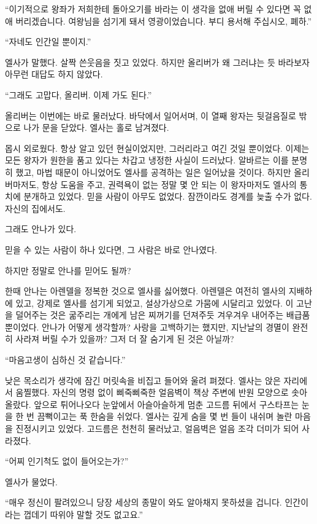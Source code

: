 ``이기적으로 왕좌가 저희한테 돌아오기를 바라는 이 생각을 없애 버릴 수 있다면 꼭 없애 버리겠습니다. 여왕님을 섬기게 돼서 영광이었습니다. 부디 용서해 주십시오, 폐하.''

``자네도 인간일 뿐이지.''

엘사가 말했다. 살짝 쓴웃음을 짓고 있었다. 하지만 올리버가 왜 그러냐는 듯 바라보자 아무런 대답도 하지 않았다.

``그래도 고맙다, 올리버. 이제 가도 된다.''

올리버는 이번에는 바로 물러났다. 바닥에서 일어서며, 이 열째 왕자는 뒷걸음질로 밖으로 나가 문을 닫았다. 엘사는 홀로 남겨졌다.

몹시 외로웠다. 항상 알고 있던 현실이었지만, 그러리라고 여긴 것일 뿐이었다. 이제는 모든 왕자가 원한을 품고 있다는 차갑고 냉정한 사실이 드러났다. 알바르는 이를 분명히 했고, 마법 때문이 아니었어도 엘사를 공격하는 일은 일어났을 것이다. 하지만 올리버마저도, 항상 도움을 주고, 권력욕이 없는 정말 몇 안 되는 이 왕자마저도 엘사의 통치에 분개하고 있었다. 믿을 사람이 아무도 없었다. 잠깐이라도 경계를 늦출 수가 없다. 자신의 집에서도.

그래도 안나가 있다.

믿을 수 있는 사람이 하나 있다면, 그 사람은 바로 안나였다.

하지만 정말로 안나를 믿어도 될까?

한때 안나는 아렌델을 정복한 것으로 엘사를 싫어했다. 아렌델은 여전히 엘사의 지배하에 있고, 강제로 엘사를 섬기게 되었고, 설상가상으로 가뭄에 시달리고 있었다. 이 고난을 덜어주는 것은 굶주리는 개에게 남은 찌꺼기를 던져주듯 겨우겨우 내어주는 배급품뿐이었다. 안나가 어떻게 생각할까? 사랑을 고백하기는 했지만, 지난날의 경멸이 완전히 사라져 버릴 수가 있을까? 그저 더 잘 숨기게 된 것은 아닐까?

``마음고생이 심하신 것 같습니다.''

낮은 목소리가 생각에 잠긴 머릿속을 비집고 들어와 울려 펴졌다. 엘사는 앉은 자리에서 움찔했다. 자신의 명령 없이 삐죽삐죽한 얼음벽이 책상 주변에 반원 모양으로 솟아올랐다. 앞으로 튀어나오다 눈앞에서 아슬아슬하게 멈춘 고드름 뒤에서 구스타프는 눈을 한 번 끔뻑이고는 푹 한숨을 쉬었다. 엘사는 깊게 숨을 몇 번 들이 내쉬며 놀란 마음을 진정시키고 있었다. 고드름은 천천히 물러났고, 얼음벽은 얼음 조각 더미가 되어 사라졌다.

``어찌 인기척도 없이 들어오는가?''

엘사가 물었다.

``매우 정신이 팔려있으니 당장 세상의 종말이 와도 알아채지 못하셨을 겁니다. 인간이라는 껍데기 따위야 말할 것도 없고요.''

